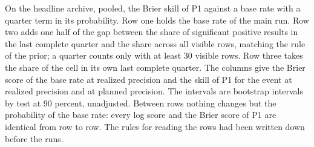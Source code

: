 \begin{table}[tp]\centering\scriptsize
\caption{On the headline archive, pooled, the Brier skill of P1 against a base rate with a quarter term in its probability. Row one holds the base rate of the main run. Row two adds one half of the gap between the share of significant positive results in the last complete quarter and the share across all visible rows, matching the rule of the prior; a quarter counts only with at least 30 visible rows. Row three takes the share of the cell in its own last complete quarter. The columns give the Brier score of the base rate at realized precision and the skill of P1 for the event at realized precision and at planned precision. The intervals are bootstrap intervals by test at 90 percent, unadjusted. Between rows nothing changes but the probability of the base rate: every log score and the Brier score of P1 are identical from row to row. The rules for reading the rows had been written down before the runs.}
\label{tab:fmt-base-recency}
\resizebox{\columnwidth}{!}{%
}
\end{table}

